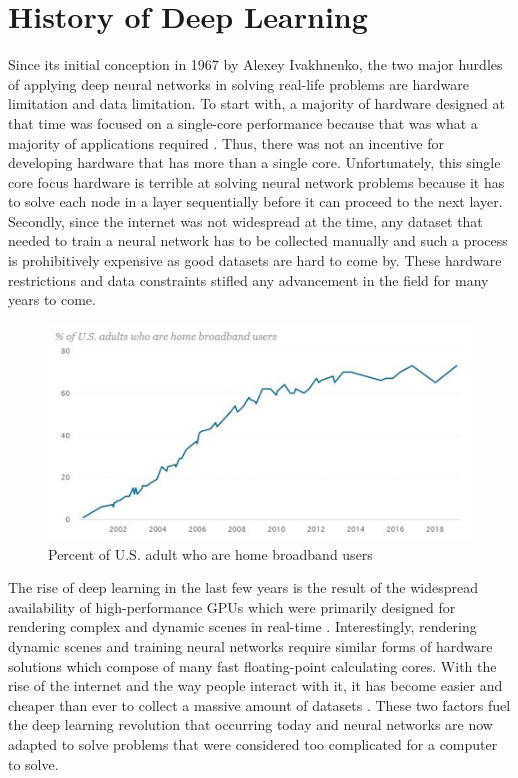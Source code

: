 \documentclass[conference]{IEEEtran}
\begin{document}
    
    \section{History of Deep Learning}
        Since its initial conception in 1967 by Alexey Ivakhnenko, the two major hurdles of applying deep neural networks in solving real-life problems are hardware limitation and data limitation. To start with, a majority of hardware designed at that time was focused on a single-core performance because that was what a majority of applications required \cite{inproceedings}. Thus, there was not an incentive for developing hardware that has more than a single core. Unfortunately, this single core focus hardware is terrible at solving neural network problems because it has to solve each node in a layer sequentially before it can proceed to the next layer. Secondly, since the internet was not widespread at the time, any dataset that needed to train a neural network has to be collected manually \cite{pew_research_center} and such a process is prohibitively expensive as good datasets are hard to come by. These hardware restrictions and data constraints stifled any advancement in the field for many years to come.

        \begin{figure}[!htb]
            \centering
            \captionsetup{justification=centering}
            \includegraphics[width=\linewidth]{USBroadband.png}
            \caption{Percent of U.S. adult who are home broadband users}  
        \end{figure}

        The rise of deep learning in the last few years is the result of the widespread availability of high-performance GPUs which were primarily designed for rendering complex and dynamic scenes in real-time \cite{nickolls_dally_2010}. Interestingly, rendering dynamic scenes and training neural networks require similar forms of hardware solutions which compose of many fast floating-point calculating cores. With the rise of the internet and the way people interact with it, it has become easier and cheaper than ever to collect a massive amount of datasets \cite{deng_dong_socher_li_li_fei-fei_2009}. These two factors fuel the deep learning revolution that occurring today and neural networks are now adapted to solve problems that were considered too complicated for a computer to solve.
        
\end{document}

